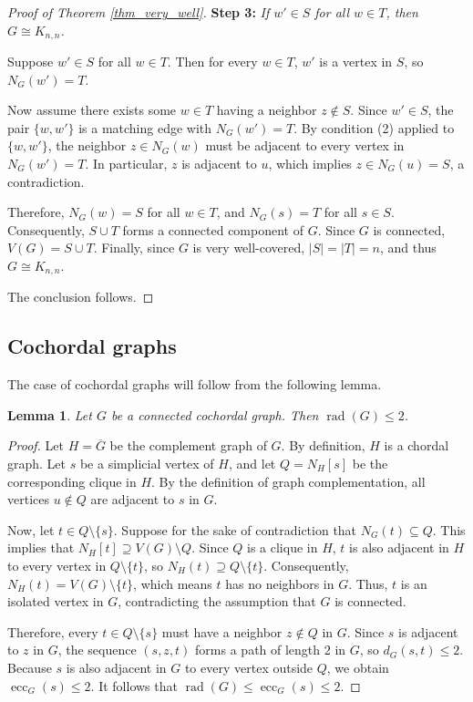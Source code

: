 \documentclass[10pt,a4paper]{amsart}
\numberwithin{equation}{section}
\newtheorem{lem}[thm]{\bf Lemma}
\theoremstyle{definition}
\begin{document}
\begin{proof}[Proof of Theorem \ref{thm_very_well}]
\smallskip
\noindent\textbf{Step 3:} \emph{If $w' \in S$ for all $w \in T$, then $G \cong K_{n,n}$.}

Suppose $w' \in S$ for all $w \in T$. Then for every $w \in T$, $w'$ is a vertex in $S$, so $N_G(w') = T$. 

Now assume there exists some $w \in T$ having a neighbor $z \notin S$. Since $w' \in S$, the pair $\{w, w'\}$ is a matching edge with $N_G(w') = T$. By condition (2) applied to $\{w, w'\}$, the neighbor $z \in N_G(w)$ must be adjacent to every vertex in $N_G(w') = T$. In particular, $z$ is adjacent to $u$, which implies $z \in N_G(u) = S$, a contradiction. 

Therefore, $N_G(w) = S$ for all $w \in T$, and $N_G(s) = T$ for all $s \in S$. Consequently, $S \cup T$ forms a connected component of $G$. Since $G$ is connected, $V(G) = S \cup T$. Finally, since $G$ is very well-covered, $|S| = |T| = n$, and thus $G \cong K_{n,n}$.

The conclusion follows.
\end{proof}


\subsection{Cochordal graphs}
The case of cochordal graphs will follow from the following lemma.

\begin{lem}\label{lem_rad_cochor} 
Let $G$ be a connected cochordal graph. Then $\operatorname{rad}(G) \le 2$.
\end{lem}


\begin{proof} 
Let $H = \overline{G}$ be the complement graph of $G$. By definition, $H$ is a chordal graph. Let $s$ be a simplicial vertex of $H$, and let $Q = N_H[s]$ be the corresponding clique in $H$. By the definition of graph complementation, all vertices $u \notin Q$ are adjacent to $s$ in $G$.

Now, let $t \in Q \setminus \{s\}$. Suppose for the sake of contradiction that $N_G(t) \subseteq Q$. This implies that $N_H[t] \supseteq V(G) \setminus Q$. Since $Q$ is a clique in $H$, $t$ is also adjacent in $H$ to every vertex in $Q \setminus \{t\}$, so $N_H(t) \supseteq Q \setminus \{t\}$. Consequently, $N_H(t) = V(G) \setminus \{t\}$, which means $t$ has no neighbors in $G$. Thus, $t$ is an isolated vertex in $G$, contradicting the assumption that $G$ is connected.

Therefore, every $t \in Q \setminus \{s\}$ must have a neighbor $z \notin Q$ in $G$. Since $s$ is adjacent to $z$ in $G$, the sequence $(s, z, t)$ forms a path of length $2$ in $G$, so $d_G(s, t) \le 2$. Because $s$ is also adjacent in $G$ to every vertex outside $Q$, we obtain $\operatorname{ecc}_G(s) \le 2$. It follows that $\operatorname{rad}(G) \le \operatorname{ecc}_G(s) \le 2$.
\end{proof}
\end{document}
